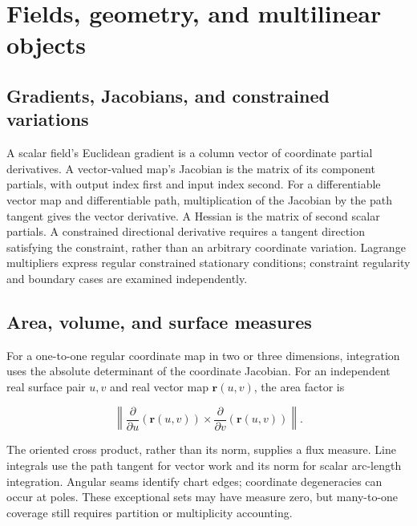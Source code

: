 \documentclass[11pt,oneside,openany]{book}
\begin{document}
\par\addvspace{8pt}\noindent\begin{minipage}{\linewidth}
\section{Fields, geometry, and multilinear objects}

\subsection{Gradients, Jacobians, and constrained variations}

A scalar field's Euclidean gradient is a column vector of coordinate partial
derivatives. A vector-valued map's Jacobian is the matrix of its component partials,
with output index first and input index second. For a differentiable vector map
and differentiable path, multiplication of the Jacobian by the path tangent
gives the vector derivative. A Hessian is the
matrix of second scalar partials. A constrained directional derivative requires
a tangent direction satisfying the constraint, rather than an arbitrary coordinate
variation. Lagrange multipliers express regular constrained stationary conditions;
constraint regularity and boundary cases are examined independently.

\end{minipage}\par
\par\addvspace{8pt}\noindent\begin{minipage}{\linewidth}
\subsection{Area, volume, and surface measures}

For a one-to-one regular coordinate map in two or three dimensions, integration
uses the absolute determinant of the coordinate Jacobian. For an independent
real surface pair \(u,v\) and real vector map \(\mathbf r(u,v)\), the area factor is

\[
\left\|\frac{\partial}{\partial u}\left(\mathbf r(u,v)\right)
\times\frac{\partial}{\partial v}\left(\mathbf r(u,v)\right)\right\|.
\]

The oriented cross product, rather than its norm, supplies a flux measure.
Line integrals use the path tangent for vector work and its norm for scalar
arc-length integration. Angular seams identify chart edges; coordinate
degeneracies can occur at poles. These exceptional sets may have measure zero,
but many-to-one coverage still requires partition or multiplicity accounting.

\end{minipage}\par
\end{document}
